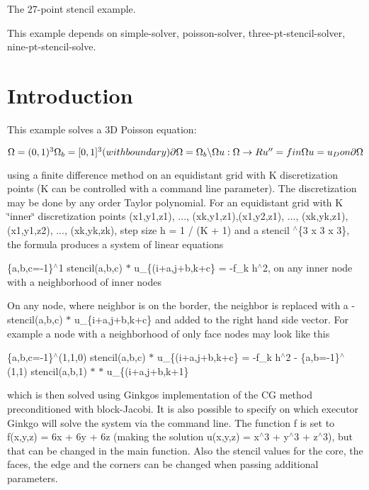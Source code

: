 The 27-\/point stencil example.

This example depends on simple-\/solver, poisson-\/solver, three-\/pt-\/stencil-\/solver, nine-\/pt-\/stencil-\/solve.

 \label{_Intro}%
 \label{_Introduction}%
\section*{Introduction}

This example solves a 3D Poisson equation\+:

$ \Omega = (0,1)^3 \Omega_b = [0,1]^3 (with boundary) \partial\Omega = \Omega_b \backslash \Omega u : \Omega \rightarrow R\\ u'' = f in \Omega\\ u = u_D on \partial\Omega $

using a finite difference method on an equidistant grid with {\ttfamily K} discretization points ({\ttfamily K} can be controlled with a command line parameter). The discretization may be done by any order Taylor polynomial. For an equidistant grid with K \char`\"{}inner\char`\"{} discretization points (x1,y1,z1), ..., (xk,y1,z1),(x1,y2,z1), ..., (xk,yk,z1), (x1,y1,z2), ..., (xk,yk,zk), step size h = 1 / (K + 1) and a stencil  $^\wedge$\{3 x 3 x 3\}, the formula produces a system of linear equations

\{a,b,c=-\/1\}$^\wedge$1 stencil(a,b,c) $\ast$ u\+\_\+\{(i+a,j+b,k+c\} = -\/f\+\_\+k h$^\wedge$2, on any inner node with a neighborhood of inner nodes

On any node, where neighbor is on the border, the neighbor is replaced with a \textquotesingle{}-\/stencil(a,b,c) $\ast$ u\+\_\+\{i+a,j+b,k+c\}\textquotesingle{} and added to the right hand side vector. For example a node with a neighborhood of only face nodes may look like this

\{a,b,c=-\/1\}$^\wedge$(1,1,0) stencil(a,b,c) $\ast$ u\+\_\+\{(i+a,j+b,k+c\} = -\/f\+\_\+k h$^\wedge$2 -\/ \{a,b=-\/1\}$^\wedge$(1,1) stencil(a,b,1) $\ast$ $\ast$ u\+\_\+\{(i+a,j+b,k+1\}

which is then solved using Ginkgo\textquotesingle{}s implementation of the CG method preconditioned with block-\/\+Jacobi. It is also possible to specify on which executor Ginkgo will solve the system via the command line. The function {\ttfamily f} is set to {\ttfamily f(x,y,z) = 6x + 6y + 6z} (making the solution {\ttfamily u(x,y,z) = x$^\wedge$3 + y$^\wedge$3 + z$^\wedge$3}), but that can be changed in the {\ttfamily main} function. Also the stencil values for the core, the faces, the edge and the corners can be changed when passing additional parameters.

